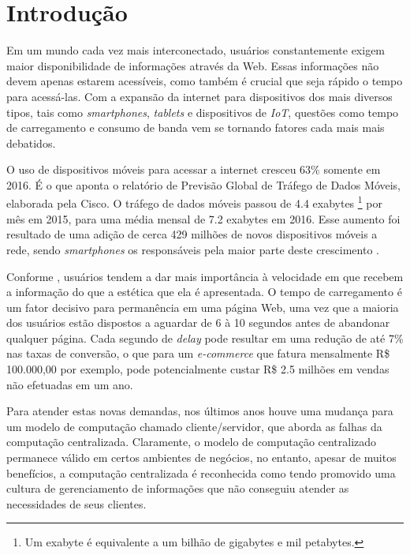 \chapter[Introdução]{Introdução}


Em um mundo cada vez mais interconectado, usuários constantemente exigem maior disponibilidade de informações através da Web. Essas informações não devem apenas estarem acessíveis, como também é crucial que seja rápido o tempo para acessá-las. Com a expansão da internet para dispositivos dos mais diversos tipos, tais como \textit{smartphones}, \textit{tablets} e dispositivos de \textit{IoT}, questões como tempo de carregamento e consumo de banda vem se tornando fatores cada mais mais debatidos.

O uso de dispositivos móveis para acessar a internet cresceu 63\% somente em 2016. É o que aponta o relatório de Previsão Global de Tráfego de Dados Móveis, elaborada pela Cisco. O tráfego de dados móveis passou de  4.4 exabytes \footnote{Um exabyte é equivalente a um bilhão de gigabytes e mil petabytes.} por mês em 2015, para uma média mensal de 7.2 exabytes em 2016. Esse aumento foi resultado de uma adição de cerca 429 milhões de novos dispositivos móveis a rede, sendo \textit{smartphones} os responsáveis pela maior parte deste crescimento \cite{cisco-network-report}.

Conforme , usuários tendem a dar mais importância à velocidade em que recebem a informação do que a estética que ela é apresentada. O tempo de carregamento é um fator decisivo para permanência em uma página Web, uma vez que a maioria dos usuários estão dispostos a aguardar de 6 à 10 segundos antes de abandonar qualquer página. Cada segundo de \textit{delay} pode resultar em uma redução de até 7\% nas taxas de conversão, o que para um \textit{e-commerce} que fatura mensalmente R\$ 100.000,00 por exemplo, pode potencialmente custar R\$ 2.5 milhões em vendas não efetuadas em um ano.

Para atender estas novas demandas, nos últimos anos houve uma mudança para um modelo de computação chamado cliente/servidor, que aborda as falhas da computação centralizada. Claramente, o modelo de computação centralizado permanece válido em certos ambientes de negócios, no entanto, apesar de muitos benefícios, a computação centralizada é reconhecida como tendo promovido uma cultura de gerenciamento de informações que não conseguiu atender as necessidades de seus clientes.

